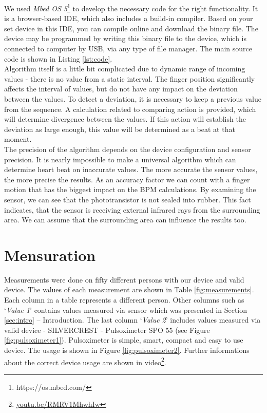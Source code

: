 \documentclass[11pt,a4paper]{article}
\begin{document}
We used \textit{Mbed OS 5}\footnote{https://os.mbed.com/} to develop the necessary code for the right functionality. It is a browser-based IDE, which also includes a build-in compiler. Based on your set device in this IDE, you can compile online and download the binary file. The device may be programmed by writing this binary file to the device, which is connected to computer by USB, via any type of file manager. The main source code is shown in Listing \ref{lst:code}.\\

Algorithm itself is a little bit complicated due to dynamic range of incoming values - there is no value from a static interval. The finger position significantly affects the interval of values, but do not have any impact on the deviation between the values. To detect a deviation, it is necessary to keep a previous value from the sequence. A calculation related to comparing action is provided, which will determine divergence between the values. If this action will establish the deviation as large enough, this value will be determined as a beat at that moment.\\

The precision of the algorithm depends on the device configuration and sensor precision. It is nearly impossible to make a universal algorithm which can determine heart beat on inaccurate values. The more accurate the sensor values, the more precise the results. As an accuracy factor we can count with a finger motion that has the biggest impact on the BPM calculations. By examining the sensor, we can see that the phototransistor is not sealed into rubber. This fact indicates, that the sensor is receiving external infrared rays from the surrounding area. We can assume that the surrounding area can influence the results too.

\section{Mensuration}

Measurements were done on fifty different persons with our device and valid device. The values of each measurement are shown in Table \ref{fig:measurements}. Each column in a table represents a different person. Other columns such as `\textit{Value 1}' contains values measured via sensor which was presented in Section \ref{sec:intro} -- Introduction. The last column `\textit{Value 2}' includes values measured via valid device - SILVERCREST - Pulsoximeter SPO 55 (see Figure \ref{fig:pulsoximeter1}). Pulsoximeter is simple, smart, compact and easy to use device. The usage is shown in Figure \ref{fig:pulsoximeter2}. Further informations about the correct device usage are shown in video\footnote{\href{https://youtu.be/RMRV1MhwhIw}{youtu.be/RMRV1MhwhIw}}.\\
\end{document}
